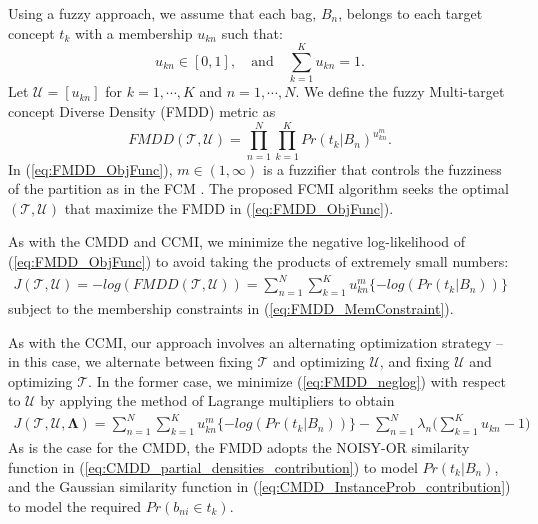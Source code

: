 \documentclass[12pt,dvips]{report}
\numberwithin{equation}{section}
\begin{document}
 Using a fuzzy approach, we assume that each bag, $B_n$, belongs to each target concept $t_k$ with a membership $u_{kn}$ such that:
\begin{equation} \label{eq:FMDD_MemConstraint}
u_{kn}\in [0,1] , \quad \text{and} \quad  \sum_{k=1}^{K} u_{kn}=1.
\end{equation}
Let $\mathcal{U}$$=$$[u_{kn}]$ for $k=1,\cdots,K$ and $n=1, \cdots, N$.
We define the fuzzy Multi-target concept Diverse Density (FMDD) metric as
\begin{equation} \label{eq:FMDD_ObjFunc}
FMDD(\mathcal{T}, \mathcal{U})=\prod_{n=1}^{N}\prod_{k=1}^{K}Pr(t_{k}\vert B_{n})^{u_{kn}^{m}}.
 \end{equation}
In (\ref{eq:FMDD_ObjFunc}), $m \in (1,\infty)$ is a fuzzifier that controls the fuzziness of the partition as in the FCM \cite{bezdek1981}.  The proposed FCMI algorithm seeks the optimal $(\mathcal{T}, \mathcal{U})$ that maximize the FMDD in (\ref{eq:FMDD_ObjFunc}).

As with the CMDD and CCMI, we minimize the negative log-likelihood of (\ref{eq:FMDD_ObjFunc}) to avoid taking the products of extremely small numbers:
\begin{eqnarray}  \label{eq:FMDD_neglog}
J(\mathcal{T}, \mathcal{U})  = -log(FMDD(\mathcal{T}, \mathcal{U})) = \sum_{n=1}^{N}\sum_{k=1}^{K} u_{kn}^{m} \{-log(Pr(t_{k}\vert B_{n}))\}
 \end{eqnarray}
subject to the membership constraints in (\ref{eq:FMDD_MemConstraint}).

As with the CCMI, our approach involves an alternating optimization strategy -- in this case, we alternate between fixing $\mathcal{T}$ and optimizing $\mathcal{U}$, and fixing $\mathcal{U}$ and optimizing $\mathcal{T}$.  In the former case, we minimize (\ref{eq:FMDD_neglog}) with respect to $ \mathcal{U}$ by applying the method of Lagrange multipliers to obtain
\begin{eqnarray}  \label{eq:FMDD_neglogLag}
J (\mathcal{T}, \mathcal{U}, \mathbf \Lambda) = \sum_{n=1}^{N}\sum_{k=1}^{K} u_{kn}^{m} \{-log(Pr(t_{k}\vert B_{n}))\} - \sum_{n=1}^{N} \lambda_{n} \big( \sum_{k=1}^{K} u_{kn}-1\big)
\end{eqnarray} As is the case for the CMDD, the FMDD adopts the NOISY-OR similarity function in (\ref{eq:CMDD_partial_densities_contribution}) to model $Pr(t_{k}\vert B_{n})$, and the Gaussian similarity function in (\ref{eq:CMDD_InstanceProb_contribution}) to model the required $Pr(b_{ni} \in t_{k})$.  
\end{document}
